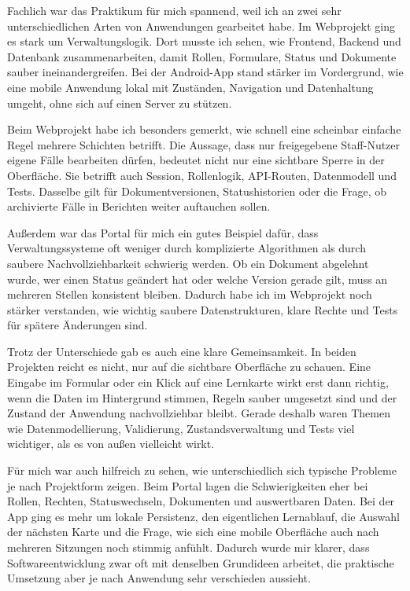 \documentclass{Vorlage}
\begin{document}
Fachlich war das Praktikum f\"ur mich spannend, weil ich an zwei sehr unterschiedlichen Arten von Anwendungen gearbeitet habe. Im Webprojekt ging es stark um Verwaltungslogik. Dort musste ich sehen, wie Frontend, Backend und Datenbank zusammenarbeiten, damit Rollen, Formulare, Status und Dokumente sauber ineinandergreifen. Bei der Android-App stand st\"arker im Vordergrund, wie eine mobile Anwendung lokal mit Zust\"anden, Navigation und Datenhaltung umgeht, ohne sich auf einen Server zu st\"utzen.

Beim Webprojekt habe ich besonders gemerkt, wie schnell eine scheinbar einfache Regel mehrere Schichten betrifft. Die Aussage, dass nur freigegebene Staff-Nutzer eigene F\"alle bearbeiten d\"urfen, bedeutet nicht nur eine sichtbare Sperre in der Oberfl\"ache. Sie betrifft auch Session, Rollenlogik, API-Routen, Datenmodell und Tests. Dasselbe gilt f\"ur Dokumentversionen, Statushistorien oder die Frage, ob archivierte F\"alle in Berichten weiter auftauchen sollen.

Au\ss{}erdem war das Portal f\"ur mich ein gutes Beispiel daf\"ur, dass Verwaltungssysteme oft weniger durch komplizierte Algorithmen als durch saubere Nachvollziehbarkeit schwierig werden. Ob ein Dokument abgelehnt wurde, wer einen Status ge\"andert hat oder welche Version gerade gilt, muss an mehreren Stellen konsistent bleiben. Dadurch habe ich im Webprojekt noch st\"arker verstanden, wie wichtig saubere Datenstrukturen, klare Rechte und Tests f\"ur sp\"atere \"Anderungen sind.

Trotz der Unterschiede gab es auch eine klare Gemeinsamkeit. In beiden Projekten reicht es nicht, nur auf die sichtbare Oberfl\"ache zu schauen. Eine Eingabe im Formular oder ein Klick auf eine Lernkarte wirkt erst dann richtig, wenn die Daten im Hintergrund stimmen, Regeln sauber umgesetzt sind und der Zustand der Anwendung nachvollziehbar bleibt. Gerade deshalb waren Themen wie Datenmodellierung, Validierung, Zustandsverwaltung und Tests viel wichtiger, als es von au\ss{}en vielleicht wirkt.

F\"ur mich war auch hilfreich zu sehen, wie unterschiedlich sich typische Probleme je nach Projektform zeigen. Beim Portal lagen die Schwierigkeiten eher bei Rollen, Rechten, Statuswechseln, Dokumenten und auswertbaren Daten. Bei der App ging es mehr um lokale Persistenz, den eigentlichen Lernablauf, die Auswahl der n\"achsten Karte und die Frage, wie sich eine mobile Oberfl\"ache auch nach mehreren Sitzungen noch stimmig anf\"uhlt. Dadurch wurde mir klarer, dass Softwareentwicklung zwar oft mit denselben Grundideen arbeitet, die praktische Umsetzung aber je nach Anwendung sehr verschieden aussieht.
\end{document}
